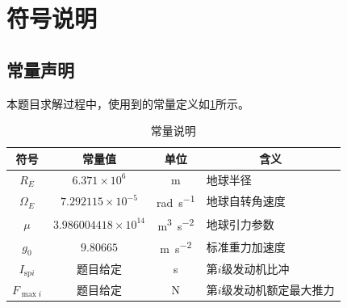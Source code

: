 \documentclass{JXUSTmodeling}
\begin{document}
\section{符号说明}\label{sec:4}
\subsection{常量声明}
本题目求解过程中，使用到的常量定义如\ref{tab:constant_table}所示。
\begin{table}[htbp]
	\centering
	\caption{常量说明}
	\label{tab:constant_table}
	\renewcommand{\arraystretch}{0.9}
	\begin{tabularx}{\textwidth}{cccX}
		\toprule
		符号 & 常量值 & 单位 & \multicolumn{1}{c}{含义}\\
		\midrule
		$R_E$
		& $6.371\times10^{6}$
		& \si{\metre}
		& 地球半径 \\
		$\Omega_E$
		& $7.292115\times10^{-5}$
		& \si{\radian\per\second}
		& 地球自转角速度 \\ 
		$\mu$
		& $3.986004418\times10^{14}$
		& \si{\metre\cubed\per\second\squared}
		& 地球引力参数 \\
		$g_0$
		& $9.80665$
		& \si{\metre\per\second\squared}
		& 标准重力加速度 \\
		
		$I_{\mathrm{sp} i}$
		& 题目给定
		& \si{\second}
		& 第$i$级发动机比冲 \\
		
		$F_{\max i}$
		& 题目给定
		& \si{\newton}
		& 第$i$级发动机额定最大推力 \\
		\bottomrule
	\end{tabularx}
\end{table}
\end{document}

